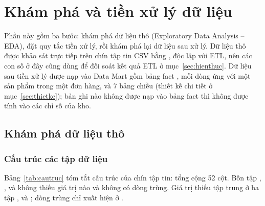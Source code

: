 \section{Khám phá và tiền xử lý dữ liệu}\label{sec:eda}

Phần này gồm ba bước: khám phá dữ liệu thô (Exploratory Data Analysis -- EDA), đặt quy tắc tiền xử lý, rồi khám phá lại dữ liệu sau xử lý. Dữ liệu thô được khảo sát trực tiếp trên chín tập tin CSV bằng , độc lập với ETL, nên các con số ở đây cũng dùng để đối soát kết quả ETL ở mục~\ref{sec:hienthuc}. Dữ liệu sau tiền xử lý được nạp vào Data Mart gồm bảng fact , mỗi dòng ứng với một sản phẩm trong một đơn hàng, và 7 bảng chiều (thiết kế chi tiết ở mục~\ref{sec:thietke}); bản ghi nào không được nạp vào bảng fact thì không được tính vào các chỉ số của kho.

\subsection{Khám phá dữ liệu thô}\label{sec:edatho}

\subsubsection{Cấu trúc các tập dữ liệu}

Bảng~\ref{tab:cautruc} tóm tắt cấu trúc của chín tập tin: tổng cộng 52 cột. Bốn tập , ,  và  không thiếu giá trị nào và không có dòng trùng. Giá trị thiếu tập trung ở ba tập ,  và ; dòng trùng chỉ xuất hiện ở .

